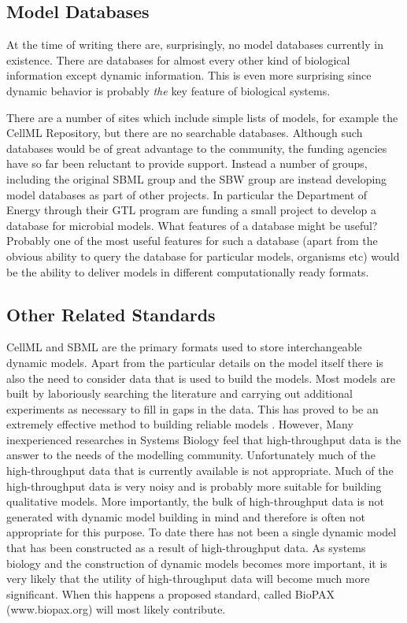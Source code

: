 \documentclass[12pt]{article}
\begin{document}
{\subsection {Model Databases}

At the time of writing there are, surprisingly, no model databases
currently in existence. There are databases for almost every other
kind of biological information except dynamic information. This is even
more surprising since dynamic behavior is probably {\em the} key feature
of biological systems. 

There are a number of sites which include simple lists of models, for example the CellML Repository, but there are no searchable databases. Although such databases would
be of great advantage to the community, the funding agencies have
so far been reluctant to provide support. Instead a number of
groups, including the original SBML group and the SBW group are
instead developing model databases as part of other projects. In
particular the Department of Energy through their GTL program are
funding a small project to develop a database for microbial
models. What features of a database might be useful? Probably one
of the most useful features for such a database (apart from the
obvious ability to query the database for particular models, organisms etc)
would be the ability to deliver models in different computationally ready formats.

\subsection{Other Related Standards}

CellML and SBML are the primary formats used to store interchangeable dynamic models. Apart from the particular details on the model itself there is also the need to consider data that is used to build the models. Most models are built by laboriously searching the literature and carrying out additional experiments as necessary to fill in gaps in the data. This has proved to be an extremely effective method to building reliable models \cite{TysonNatReview2001,TysonBioessay2002}. However, Many inexperienced researches in Systems Biology feel that high-throughput data is the answer to the needs of the modelling community. Unfortunately much of the high-throughput data that is currently available is not appropriate. Much of the high-throughput data is very noisy and is probably more suitable for building qualitative models. More importantly, the bulk of high-throughput data is not generated with dynamic model building in mind and therefore is often not appropriate for this purpose. To date there has not been a single dynamic model that has been constructed as a result of high-throughput data. As systems biology and the construction of dynamic models becomes more important, it is very likely that the utility of high-throughput data will become much more significant. When this happens a proposed standard, called BioPAX (www.biopax.org) will most likely contribute.

}
\end{document}
